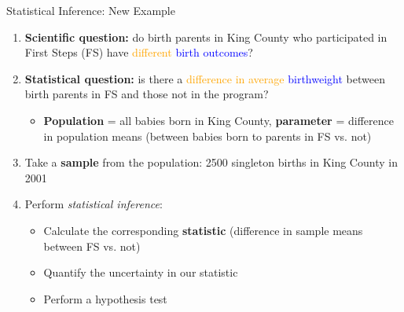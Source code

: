 \documentclass[10pt,t]{beamer}
\begin{document}
\begin{frame}{Statistical Inference: New Example}

\begin{enumerate}
	\item \textbf{Scientific question:} do birth parents in King County who participated in First Steps (FS) have \textcolor{orange}{different} \textcolor{blue}{birth outcomes}?
	\item \textbf{Statistical question:} is there a \textcolor{orange}{difference in average} \textcolor{blue}{birthweight} between birth parents in FS and those not in the program?
	\begin{itemize}
		\item \textbf{Population} = all babies born in King County, \textbf{parameter} = difference in population means (between babies born to parents in FS vs. not)
	\end{itemize}
	\item Take a \textbf{sample} from the population: 2500 singleton births in King County in 2001
	\item Perform \textit{statistical inference}:
	\begin{itemize}
		\item Calculate the corresponding \textbf{statistic} (difference in sample means between FS vs. not)
		\item Quantify the uncertainty in our statistic
		\item Perform a hypothesis test
	\end{itemize}
\end{enumerate}

\end{frame}
\end{document}
